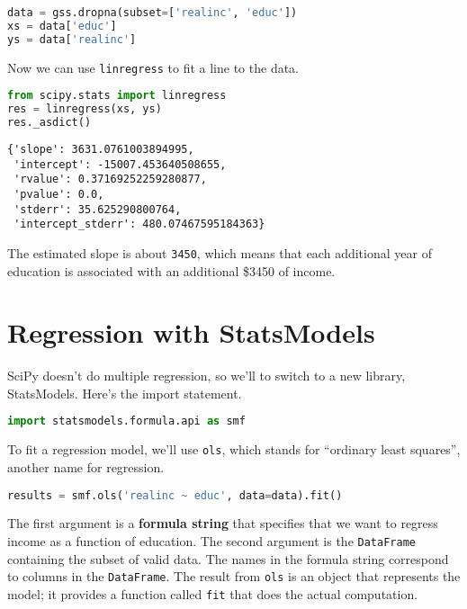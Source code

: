 \begin{lstlisting}[language=Python,style=source]
data = gss.dropna(subset=['realinc', 'educ'])
xs = data['educ']
ys = data['realinc']
\end{lstlisting}

Now we can use \passthrough{\lstinline!linregress!} to fit a line to the
data.

\begin{lstlisting}[language=Python,style=source]
from scipy.stats import linregress
res = linregress(xs, ys)
res._asdict()
\end{lstlisting}

\begin{lstlisting}[style=output]
{'slope': 3631.0761003894995,
 'intercept': -15007.453640508655,
 'rvalue': 0.37169252259280877,
 'pvalue': 0.0,
 'stderr': 35.625290800764,
 'intercept_stderr': 480.07467595184363}
\end{lstlisting}

The estimated slope is about \passthrough{\lstinline!3450!}, which means
that each additional year of education is associated with an additional
\$3450 of income.

\hypertarget{regression-with-statsmodels}{%
\section{Regression with
StatsModels}\label{regression-with-statsmodels}}

SciPy doesn't do multiple regression, so we'll to switch to a new
library, StatsModels. Here's the import statement.

\begin{lstlisting}[language=Python,style=source]
import statsmodels.formula.api as smf
\end{lstlisting}

To fit a regression model, we'll use \passthrough{\lstinline!ols!},
which stands for ``ordinary least squares'', another name for
regression.

\begin{lstlisting}[language=Python,style=source]
results = smf.ols('realinc ~ educ', data=data).fit()
\end{lstlisting}

The first argument is a \textbf{formula string} that specifies that we
want to regress income as a function of education. The second argument
is the \passthrough{\lstinline!DataFrame!} containing the subset of
valid data. The names in the formula string correspond to columns in the
\passthrough{\lstinline!DataFrame!}. The result from
\passthrough{\lstinline!ols!} is an object that represents the model; it
provides a function called \passthrough{\lstinline!fit!} that does the
actual computation.

